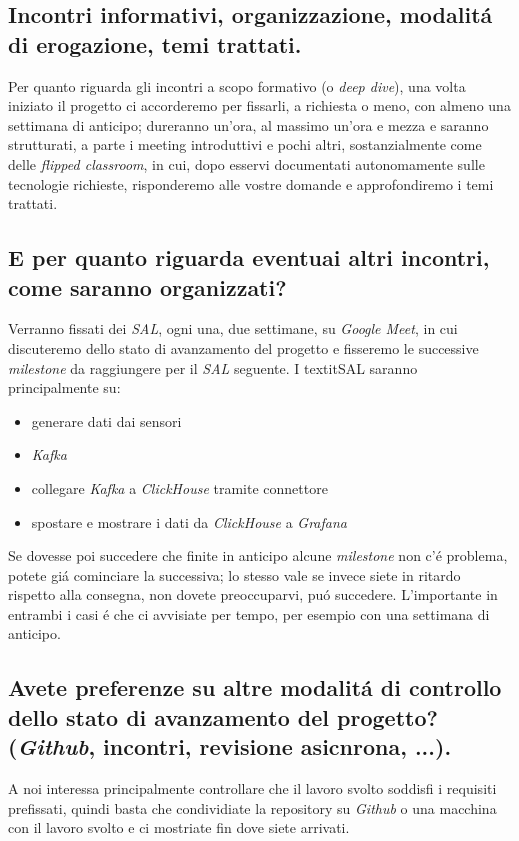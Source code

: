 \subsection{Incontri informativi, organizzazione, modalitá di erogazione, temi trattati.}
Per quanto riguarda gli incontri a scopo formativo (o \textit{deep dive}), una volta iniziato il progetto ci accorderemo per fissarli, a richiesta o meno, con almeno una settimana di anticipo; dureranno un'ora, al massimo un'ora e mezza e saranno strutturati, a parte i meeting introduttivi e pochi altri, sostanzialmente come delle \textit{flipped classroom}, in cui, dopo esservi documentati autonomamente sulle tecnologie richieste, risponderemo alle vostre domande e approfondiremo i temi trattati.
\subsection{E per quanto riguarda eventuai altri incontri, come saranno organizzati?}
Verranno fissati dei \textit{SAL}, ogni una, due settimane, su \textit{Google Meet}, in cui discuteremo dello stato di avanzamento del progetto e fisseremo le successive \textit{milestone} da raggiungere per il \textit{SAL} seguente. I textit{SAL} saranno principalmente su:
\begin{itemize}
    \setlength\itemsep{0em}
    \item generare dati dai sensori
    \item \textit{Kafka}
    \item collegare \textit{Kafka} a \textit{ClickHouse} tramite connettore
    \item spostare e mostrare i dati da \textit{ClickHouse} a \textit{Grafana}
\end{itemize}
Se dovesse poi succedere che finite in anticipo alcune \textit{milestone} non c'é problema, potete giá cominciare la successiva; lo stesso vale se invece siete in ritardo rispetto alla consegna, non dovete preoccuparvi, puó succedere. L'importante in entrambi i casi é che ci avvisiate per tempo, per esempio con una settimana di anticipo.
\subsection{Avete preferenze su altre modalitá di controllo dello stato di avanzamento del progetto? (\textit{Github}, incontri, revisione asicnrona, ...).}
A noi interessa principalmente controllare che il lavoro svolto soddisfi i requisiti prefissati, quindi basta che condividiate la repository su \textit{Github} o una macchina con il lavoro svolto e ci mostriate fin dove siete arrivati.
